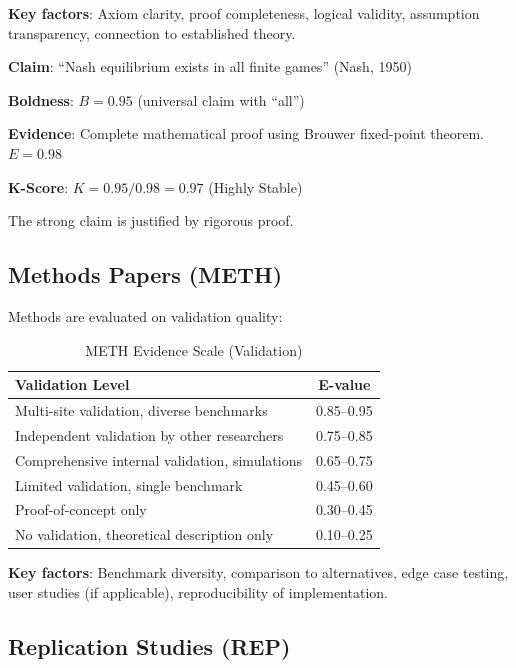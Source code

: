 \documentclass[11pt,a4paper]{article}
\begin{document}
\textbf{Key factors}: Axiom clarity, proof completeness, logical validity, assumption transparency, connection to established theory.

\begin{examplebox}[title={Theoretical Paper Example}]
\textbf{Claim}: ``Nash equilibrium exists in all finite games'' (Nash, 1950)

\textbf{Boldness}: $B = 0.95$ (universal claim with ``all'')

\textbf{Evidence}: Complete mathematical proof using Brouwer fixed-point theorem. $E = 0.98$

\textbf{K-Score}: $K = 0.95/0.98 = 0.97$ (Highly Stable)

The strong claim is justified by rigorous proof.
\end{examplebox}

\subsection{Methods Papers (METH)}

Methods are evaluated on validation quality:

\begin{table}[h]
\centering
\caption{METH Evidence Scale (Validation)}
\label{tab:meth-scale}
\begin{tabular}{lc}
\toprule
\textbf{Validation Level} & \textbf{E-value} \\
\midrule
Multi-site validation, diverse benchmarks & 0.85--0.95 \\
Independent validation by other researchers & 0.75--0.85 \\
Comprehensive internal validation, simulations & 0.65--0.75 \\
Limited validation, single benchmark & 0.45--0.60 \\
Proof-of-concept only & 0.30--0.45 \\
No validation, theoretical description only & 0.10--0.25 \\
\bottomrule
\end{tabular}
\end{table}

\textbf{Key factors}: Benchmark diversity, comparison to alternatives, edge case testing, user studies (if applicable), reproducibility of implementation.

\subsection{Replication Studies (REP)}
\end{document}
